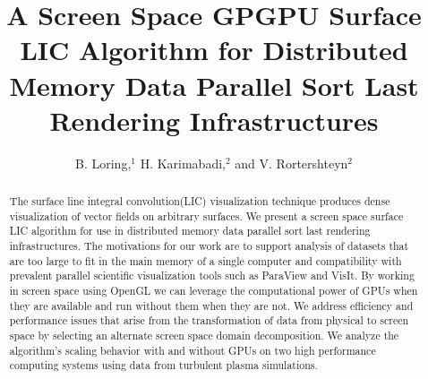\documentclass[a4paper,10pt]{article}
\begin{document}
\title{A Screen Space GPGPU Surface LIC Algorithm for Distributed Memory Data Parallel Sort Last Rendering Infrastructures}
\author{B. Loring,$^1$ H. Karimabadi,$^2$ and V. Rortershteyn$^2$
}


\begin{abstract}
The surface line integral convolution(LIC) visualization technique produces dense visualization of vector fields on arbitrary surfaces. We present a screen space surface LIC algorithm for use in distributed memory data parallel sort last rendering infrastructures. The motivations for our work are to support analysis of datasets that are too large to fit in the main memory of a single computer and compatibility with prevalent parallel scientific visualization tools such as ParaView and VisIt. By working in screen space using OpenGL we can leverage the computational power of GPUs when they are available and run without them when they are not. We address efficiency and performance issues that arise from the transformation of data from physical to screen space by selecting an alternate screen space domain decomposition. We analyze the algorithm's scaling behavior with and without GPUs on two high performance computing systems using data from turbulent plasma simulations.
\end{abstract}
\end{document}
